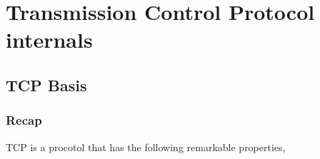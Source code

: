 \documentclass[10pt]{book}
\begin{document}
\setmonofont[Scale=.85]{Fira Code Retina}



\setlength{\headsep}{30pt}
\setlength{\footskip}{40pt}
\setlength{\marginparsep}{20pt}
\setlength{\marginparwidth}{60pt}
\tableofcontents

\part{Transmission Control Protocol internals}

\chapter{TCP Basis}

\section{Recap}
TCP is a procotol that has the following remarkable properties,
\end{document}
